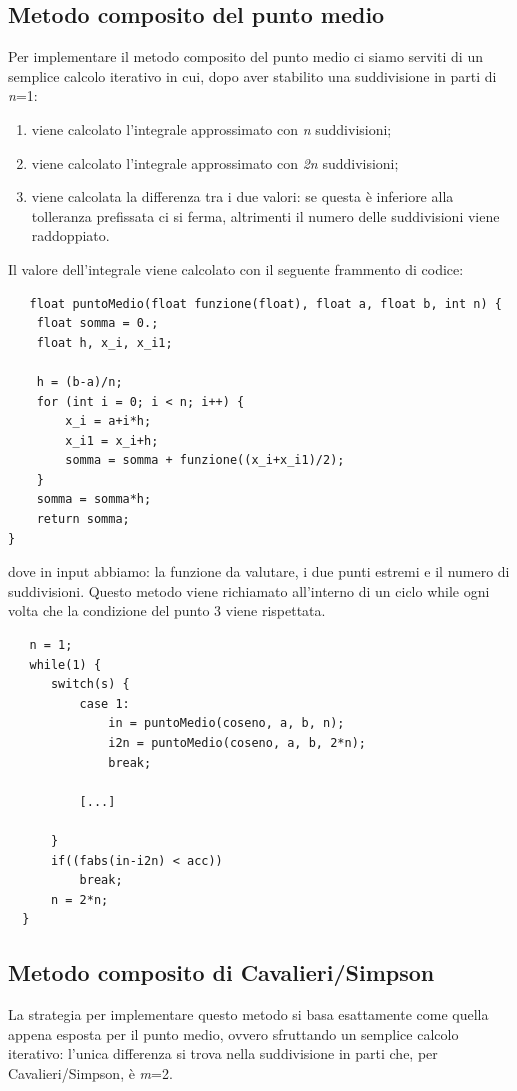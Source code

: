 \documentclass{article}
\begin{document}
\subsection{Metodo composito del punto medio}
Per implementare il metodo composito del punto medio ci siamo serviti di un semplice calcolo iterativo in cui, dopo aver stabilito una suddivisione in parti di \textit{n}=1:
\begin{enumerate}
   \item viene calcolato l'integrale approssimato con \textit{n} suddivisioni;
   \item viene calcolato l'integrale approssimato con \textit{2n} suddivisioni;
   \item viene calcolata la differenza tra i due valori: se questa è inferiore alla tolleranza prefissata ci si ferma, altrimenti il numero delle suddivisioni viene raddoppiato.
\end{enumerate}
Il valore dell'integrale viene calcolato con il seguente frammento di codice:
\begin{lstlisting}
   float puntoMedio(float funzione(float), float a, float b, int n) {
    float somma = 0.;
    float h, x_i, x_i1;

    h = (b-a)/n;
    for (int i = 0; i < n; i++) {
        x_i = a+i*h;
        x_i1 = x_i+h;
        somma = somma + funzione((x_i+x_i1)/2);
    }
    somma = somma*h;
    return somma;
}
\end{lstlisting}
dove in input abbiamo: la funzione da valutare, i due punti estremi e il numero di suddivisioni. Questo metodo viene richiamato all'interno di un ciclo while ogni volta che la condizione 
del punto 3 viene rispettata.
\begin{lstlisting}
   n = 1;
   while(1) {
      switch(s) {
          case 1:
              in = puntoMedio(coseno, a, b, n);
              i2n = puntoMedio(coseno, a, b, 2*n);
              break;

          [...]

      }     
      if((fabs(in-i2n) < acc))
          break;
      n = 2*n;
  } 
\end{lstlisting}
\subsection{Metodo composito di Cavalieri/Simpson}
La strategia per implementare questo metodo si basa esattamente come quella appena esposta per il punto medio, ovvero sfruttando un semplice calcolo iterativo: l'unica differenza si trova 
nella suddivisione in parti che, per Cavalieri/Simpson, è \textit{m}=2.
\end{document}

